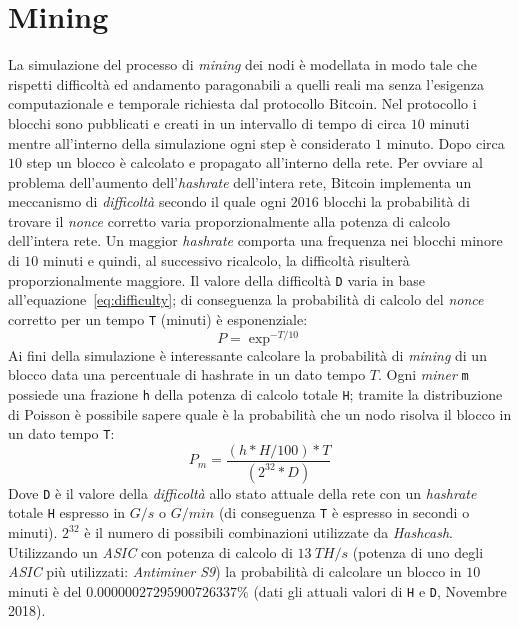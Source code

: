 \section{Mining}
La simulazione del processo di \textit{mining} dei nodi è modellata in modo tale che rispetti difficoltà ed andamento paragonabili a quelli reali ma senza l'esigenza computazionale e temporale richiesta dal protocollo Bitcoin. Nel protocollo i blocchi sono pubblicati e creati in un intervallo di tempo di circa $10$ minuti mentre all'interno della simulazione ogni step è considerato $1$ minuto. Dopo circa $10$ step un blocco è calcolato e propagato all'interno della rete. Per ovviare al problema dell'aumento dell'\textit{hashrate} dell'intera rete, Bitcoin implementa un meccanismo di \textit{difficoltà} secondo il quale ogni $2016$ blocchi la probabilità di trovare il \textit{nonce} corretto varia proporzionalmente alla potenza di calcolo dell'intera rete. Un maggior \textit{hashrate} comporta una frequenza nei blocchi minore di $10$ minuti e quindi, al successivo ricalcolo, la difficoltà risulterà proporzionalmente maggiore.\newline
Il valore della difficoltà \texttt{D} varia in base all'equazione~\ref{eq:difficulty}; di conseguenza la probabilità di calcolo del \textit{nonce} corretto per un tempo \texttt{T} (minuti) è esponenziale:
\begin{equation}
    P = \exp^{-T/10}
\end{equation}
Ai fini della simulazione è interessante calcolare la probabilità di \textit{mining} di un blocco data una percentuale di hashrate in un dato tempo $T$. Ogni \textit{miner} \texttt{m} possiede una frazione \texttt{h} della potenza di calcolo totale \texttt{H}; tramite la distribuzione di Poisson è possibile sapere quale è la probabilità che un nodo risolva il blocco in un dato tempo \texttt{T}:
\begin{equation}\label{eq:mining}
    P_m = \frac{(h * H / 100) * T}{(2^{32} * D)}
\end{equation}
Dove \texttt{D} è il valore della \textit{difficoltà} allo stato attuale della rete con un \textit{hashrate} totale \texttt{H} espresso in $G/s$ o $G/min$ (di conseguenza \texttt{T} è espresso in secondi o minuti). $2^{32}$ è il numero di possibili combinazioni utilizzate da \textit{Hashcash}.\newline
Utilizzando un \textit{ASIC} con potenza di calcolo di $13~TH/s$ (potenza di uno degli \textit{ASIC} più utilizzati: \textit{Antiminer S9}) la probabilità di calcolare un blocco in $10$ minuti è del $0.00000027295900726337\%$ (dati gli attuali valori di \texttt{H} e \texttt{D}, Novembre 2018).\newline
